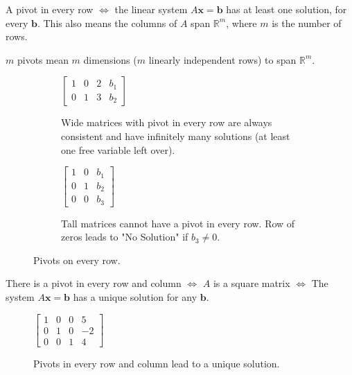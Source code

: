 \documentclass[../linear-algebra.tex]{subfiles}
\begin{document}
\noindent A pivot in every row $\iff$ the linear system $A\mathbf{x}=\mathbf{b}$
has at least one solution, for every $\mathbf{b}$. This also means the columns of $A$
span $\mathbb{R}^m$, where $m$ is the number of rows.

\noindent $m$ pivots mean $m$ dimensions ($m$ linearly independent rows) to span $\mathbb{R}^m$.

\begin{figure}[H]
     \centering
     \begin{subfigure}[b]{0.48\textwidth}
         \centering
         $\left[
         \begin{array}{ccc|c}
         \boxed{1} & 0 & 2 & b_1 \\
         0 & \boxed{1} & 3 & b_2
         \end{array}
         \right]$
         \caption{Wide matrices with pivot in every row are always consistent and have
          infinitely many solutions (at least one free variable left over).}
         \label{fig:wide_matrix}
     \end{subfigure}
     \hfill
     \begin{subfigure}[b]{0.48\textwidth}
         \centering
         $\left[
         \begin{array}{cc|c}
         \boxed{1} & 0 & b_1 \\
         0 & \boxed{1} & b_2 \\
         0 & 0 & b_3
         \end{array}
         \right]$
         \caption{Tall matrices cannot have a pivot in every row. Row of zeros leads to "No Solution" if $b_3 \neq 0$.}
         \label{fig:tall_matrix}
     \end{subfigure}
     
     \caption*{Pivots on every row.}
\end{figure}

\noindent There is a pivot in every row and column $\iff$ $A$ is a square matrix $\iff$ 
The system $A\mathbf{x}=\mathbf{b}$ has a unique solution for any $\mathbf{b}$.

\begin{figure}[h!]
    \centering
    $\left[
    \begin{array}{ccc|c}
    \boxed{1} & 0 & 0 & 5 \\
    0 & \boxed{1} & 0 & -2 \\
    0 & 0 & \boxed{1} & 4
    \end{array}
    \right]$
    \caption*{Pivots in every row and column lead to a unique solution.}
    \label{fig:square_unique}
\end{figure}
\end{document}
